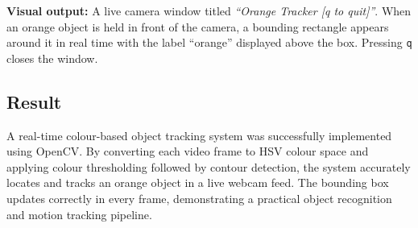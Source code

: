 \documentclass[12pt,a4paper]{article}
\begin{document}
\noindent \textbf{Visual output:} A live camera window titled
\textit{``Orange Tracker [q to quit]''}. When an orange object is held in front of the
camera, a bounding rectangle appears around it in real time with the label ``orange''
displayed above the box. Pressing \texttt{q} closes the window.

\subsection*{Result}
A real-time colour-based object tracking system was successfully implemented using OpenCV.
By converting each video frame to HSV colour space and applying colour thresholding followed
by contour detection, the system accurately locates and tracks an orange object in a live
webcam feed. The bounding box updates correctly in every frame, demonstrating a practical
object recognition and motion tracking pipeline.
\end{document}
